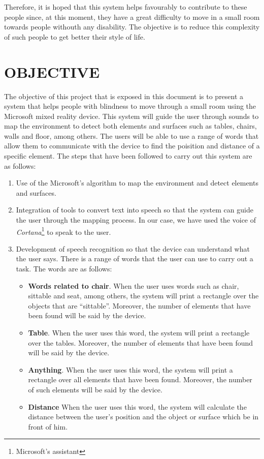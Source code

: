 \documentclass{pre-tfg}
\begin{document}
Therefore, it is hoped that this system helps favourably to contribute to these people since, at this moment, they have a great difficulty to 
move in a small room towards people withouth any disability. The objective is to reduce this complexity of such people to get better their style of life.

\section{OBJECTIVE}
The objective of this project that is exposed in this document is to present a system that helps people with blindness to move through a
small room using the Microsoft mixed reality device. This system will guide the user through sounds to map the environment to detect both elements and surfaces such as tables, chairs, walls and floor, among others. The users will be able to use a range of words that allow them
to communicate with the device to find the poisition and distance of a specific element. The steps that have been followed to carry
out this system are as follows:

\begin{enumerate}
\item Use of the Microsoft's algorithm to map the environment and detect elements and surfaces.
\item Integration of tools to convert text into speech so that the system can guide the user through the mapping process. In our case,
we have used the voice of \textit{Cortana}\footnote{Microsoft's assistant} to speak to the user.
\item Development of speech recognition so that the device can understand what the user says. There is a range of words that
the user can use to carry out a task. The words are as follows:
\begin{itemize}
\item \textbf{Words related to chair}. When the user uses words such as chair, sittable and seat, among others, the system will print a 
rectangle over the objects that are ``sittable''. Moreover, the number of elements that have been found will be said by the device.
\item \textbf{Table}. When the user uses this word, the system will print a rectangle over the tables. Moreover, the number of elements
that have been found will be said by the device.
\item \textbf{Anything}. When the user uses this word, the system will print a rectangle over all elements that have been found. Moreover, 
the number of such elements will be said by the device.
\item \textbf{Distance} When the user uses this word, the system will calculate the distance between the user's position and
the object or surface which be in front of him.
\end{itemize}
\end{enumerate}
\end{document}
